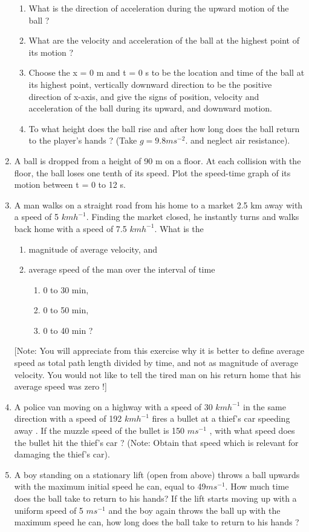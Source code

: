 \begin{enumerate}[label=\arabic*.,ref=\thesection.\theenumi]
\begin{enumerate}
\item  What is the direction of acceleration during the upward motion of the ball ? 
\item  What are the velocity and acceleration of the ball at the highest point of its motion ?
\item  Choose the x = 0 m and t = 0 s to be the location and time of the ball at its highest point, vertically downward direction to be the positive direction of x-axis, and give the signs of position, velocity and acceleration of the ball during its upward, and downward motion.
\item  To what height does the ball rise and after how long does the ball return to the player’s hands ? (Take $g = 9.8 m s^{-2}$.
and neglect air resistance).
\end{enumerate}
\item  A ball is dropped from a height of 90 m on a floor. At each collision with the floor, the ball loses one tenth of its speed. Plot the speed-time graph of its motion between t = 0 to 12 s.
\item A man walks on a straight road from his home to a market 2.5 km away with a speed of 5 $km h^{-1}$. Finding the market closed, he instantly turns and walks back home with a speed of 7.5 $km h^{-1}$. What is the 
\begin{enumerate}
\item magnitude of average velocity, and 
\item average speed of the man over the interval of time 
\begin{enumerate}
\item 0 to 30 min, 
\item 0 to 50 min, 
\item 0 to 40 min ? 
\end{enumerate}
\end{enumerate}
[Note: You will appreciate from this exercise why it is better to define average speed as total path length divided by time, and not as magnitude of average velocity. You would not like to tell the tired man on his return home that his average speed was zero !]
\item  A police van moving on a highway with a speed of 30 $km h^{-1}$
in the same direction with a speed of 192 $km h^{-1}$ 
fires a bullet at a thief's car speeding away . If the muzzle speed of the bullet is 150 $m s^{-1}$
, with
what speed does the bullet hit the thief’s car ? (Note: Obtain that speed which is relevant for damaging the thief’s car).
\item A boy standing on a stationary lift (open from above) throws a ball upwards with the maximum initial speed he can, equal to 49$ m s^{-1}$. How much time does the ball
take to return to his hands? If the lift starts moving up with a uniform speed of 5 $m s^{-1}$
and the boy again throws the ball up with the maximum speed he can, how
long does the ball take to return to his hands ? 


\end{enumerate}
